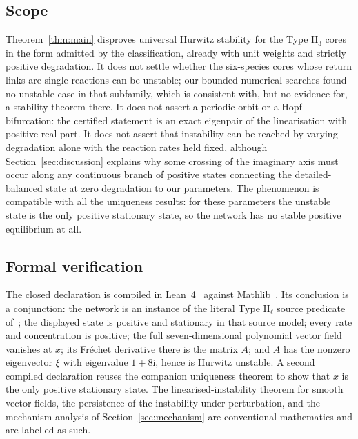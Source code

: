 \documentclass[11pt,a4paper]{article}
\theoremstyle{plain}
\theoremstyle{definition}
\theoremstyle{remark}
\numberwithin{equation}{section}
\newcommand{\II}{\mathrm{II}}
\newcommand{\iu}{\mathrm{i}}
\begin{document}
\subsection*{Scope}
Theorem~\ref{thm:main} disproves universal Hurwitz stability for the Type $\II_3$ cores in the form admitted by the classification, already with unit weights and strictly positive degradation. It does not settle whether the six-species cores whose return links are single reactions can be unstable; our bounded numerical searches found no unstable case in that subfamily, which is consistent with, but no evidence for, a stability theorem there. It does not assert a periodic orbit or a Hopf bifurcation: the certified statement is an exact eigenpair of the linearisation with positive real part. It does not assert that instability can be reached by varying degradation alone with the reaction rates held fixed, although Section~\ref{sec:discussion} explains why some crossing of the imaginary axis must occur along any continuous branch of positive states connecting the detailed-balanced state at zero degradation to our parameters. The phenomenon is compatible with all the uniqueness results: for these parameters the unstable state is the only positive stationary state, so the network has no stable positive equilibrium at all.

\subsection*{Formal verification}
The closed declaration  is compiled in Lean~4~\cite{dMU21} against Mathlib~\cite{mathlib20}. Its conclusion is a conjunction: the network is an instance of the literal Type $\II_\ell$ source predicate of~\cite{TypeIIpos,TypeIImixed}; the displayed state is positive and stationary in that source model; every rate and concentration is positive; the full seven-dimensional polynomial vector field vanishes at $x$; its Fr\'echet derivative there is the matrix $A$; and $A$ has the nonzero eigenvector $\xi$ with eigenvalue $1+8\iu$, hence is Hurwitz unstable. A second compiled declaration reuses the companion uniqueness theorem to show that $x$ is the only positive stationary state. The linearised-instability theorem for smooth vector fields, the persistence of the instability under perturbation, and the mechanism analysis of Section~\ref{sec:mechanism} are conventional mathematics and are labelled as such.
\end{document}

